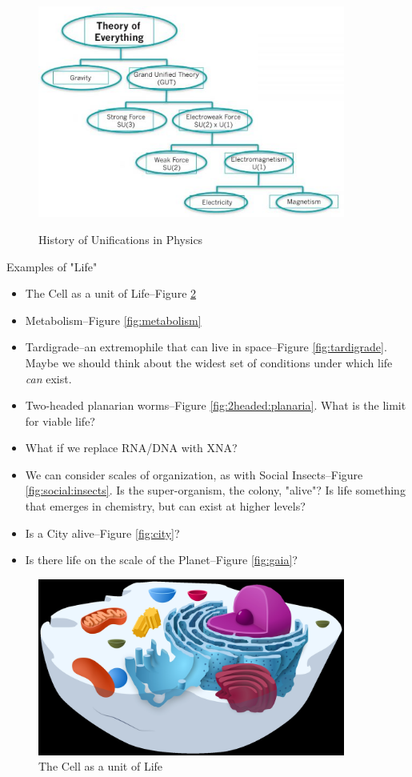 \documentclass[]{article}
\begin{document}
\begin{figure}[H]
	\caption{History of Unifications in Physics}
	\includegraphics[width=0.9\textwidth]{Unifications}\label{fig:physics:unifications}
\end{figure}


Examples of "Life"
\begin{itemize}
	\item The Cell as a unit of Life--Figure \ref{fig:cell}
	\item Metabolism--Figure \ref{fig:metabolism}
	\item Tardigrade--an extremophile that can live in space--Figure \ref{fig:tardigrade}. Maybe we should think about the widest set of conditions under which life \textit{can} exist.
	\item Two-headed planarian worms--Figure \ref{fig:2headed:planaria}. What is the limit for viable life?\cite{levin2019planarian}
	\item What if we replace RNA/DNA with XNA?
	\item We can consider scales of organization, as with Social Insects--Figure \ref{fig:social:insects}. Is the super-organism, the colony, "alive"? Is life something that emerges in chemistry, but can exist at higher levels?\cite{pratt2015psychology}
	\item Is a City alive--Figure \ref{fig:city}?
	\item Is there life on the scale of the Planet\cite{lovelock1974atmospheric}--Figure \ref{fig:gaia}?
\end{itemize}

\begin{figure}[H]
	\caption{The Cell as a unit of Life}\label{fig:cell}
	\includegraphics[width=0.9\textwidth]{Cell}
\end{figure}
\end{document}
